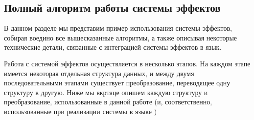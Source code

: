 \subsection{Полный алгоритм работы системы эффектов}

В данном разделе мы представим пример использования системы эффектов, собирая воедино все вышесказанные алгоритмы, а также описывая некоторые технические детали, связанные с интеграцией системы эффектов в язык.

Работа с системой эффектов осуществляется в несколько этапов. На каждом этапе имеется некоторая отдельная структура данных, и между двумя последовательными этапами существует преобразование, переводящее одну структуру в другую. Ниже мы вкртаце опишем каждую структуру и преобразование, использованные в данной работе (и, соответственно, использованные при реализации системы в языке )

